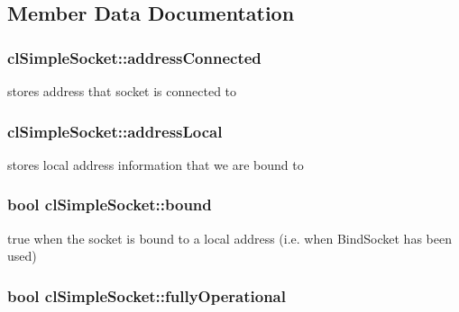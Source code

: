 \subsection{Member Data Documentation}
\hypertarget{classcl_simple_socket_ae777e37939afd56e6bde9c3513ad7b75}{
\subsubsection[{addressConnected}]{ {\bf clSimpleSocket::addressConnected}}}
\label{classcl_simple_socket_ae777e37939afd56e6bde9c3513ad7b75}
stores address that socket is connected to \hypertarget{classcl_simple_socket_aab91a0e6aae916c873175e7ff04bbc50}{
\subsubsection[{addressLocal}]{ {\bf clSimpleSocket::addressLocal}}}
\label{classcl_simple_socket_aab91a0e6aae916c873175e7ff04bbc50}
stores local address information that we are bound to \hypertarget{classcl_simple_socket_a780c2c352ef115d7194c401566126a20}{
\subsubsection[{bound}]{\setlength{\rightskip}{0pt plus 5cm}bool {\bf clSimpleSocket::bound}}}
\label{classcl_simple_socket_a780c2c352ef115d7194c401566126a20}
true when the socket is bound to a local address (i.e. when BindSocket has been used) \hypertarget{classcl_simple_socket_afa5ce1a66de16e6184770e528fd0a03f}{
\subsubsection[{fullyOperational}]{\setlength{\rightskip}{0pt plus 5cm}bool {\bf clSimpleSocket::fullyOperational}}}
